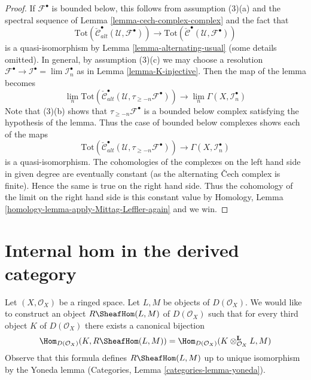 \begin{proof}
If $\mathcal{F}^\bullet$ is bounded below, this follows from assumption
(3)(a) and the spectral sequence of
Lemma \ref{lemma-cech-complex-complex}
and the fact that
$$
\text{Tot}(\check{\mathcal{C}}^\bullet_{alt}(\mathcal{U}, \mathcal{F}^\bullet))
\longrightarrow
\text{Tot}(\check{\mathcal{C}}^\bullet(\mathcal{U}, \mathcal{F}^\bullet))
$$
is a quasi-isomorphism by
Lemma \ref{lemma-alternating-usual} (some details omitted).
In general, by assumption (3)(c) we may choose a resolution
$\mathcal{F}^\bullet \to \mathcal{I}^\bullet = \lim \mathcal{I}_n^\bullet$
as in Lemma \ref{lemma-K-injective}.
Then the map of the lemma becomes
$$
\lim_n 
\text{Tot}(\check{\mathcal{C}}^\bullet_{alt}(\mathcal{U},
\tau_{\geq -n}\mathcal{F}^\bullet))
\longrightarrow
\lim_n \Gamma(X, \mathcal{I}_n^\bullet)
$$
Note that (3)(b) shows that $\tau_{\geq -n}\mathcal{F}^\bullet$
is a bounded below complex satisfying the hypothesis of the lemma.
Thus the case of bounded below complexes shows each of the maps
$$
\text{Tot}(\check{\mathcal{C}}^\bullet_{alt}(\mathcal{U},
\tau_{\geq -n}\mathcal{F}^\bullet))
\longrightarrow
\Gamma(X, \mathcal{I}_n^\bullet)
$$
is a quasi-isomorphism. The cohomologies of the complexes on the left
hand side in given degree are eventually
constant (as the alternating {\v C}ech complex is finite).
Hence the same is true on the right hand side.
Thus the cohomology of the limit on the right hand side is
this constant value by
Homology, Lemma \ref{homology-lemma-apply-Mittag-Leffler-again} and we win.
\end{proof}






\section{Internal hom in the derived category}
\label{section-internal-hom}

\noindent
Let $(X, \mathcal{O}_X)$ be a ringed space. Let $L, M$ be objects
of $D(\mathcal{O}_X)$. We would like to construct an object
$R\SheafHom(L, M)$ of $D(\mathcal{O}_X)$ such that for every third
object $K$ of $D(\mathcal{O}_X)$ there exists a canonical bijection
\begin{equation}
\label{equation-internal-hom}
\Hom_{D(\mathcal{O}_X)}(K, R\SheafHom(L, M))
=
\Hom_{D(\mathcal{O}_X)}(K \otimes_{\mathcal{O}_X}^\mathbf{L} L, M)
\end{equation}
Observe that this formula defines $R\SheafHom(L, M)$ up to unique
isomorphism by the Yoneda lemma
(Categories, Lemma \ref{categories-lemma-yoneda}).


